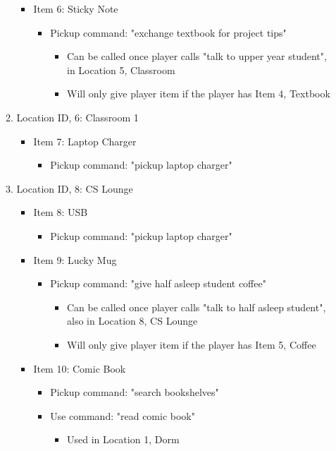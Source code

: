 \documentclass[11pt]{article}
\begin{document}
\begin{enumerate}
\begin{enumerate}
    \begin{itemize}
        \item Item 6: Sticky Note
        \begin{itemize}
            \item Pickup command: "exchange textbook for project tips"
            \begin{itemize}
                \item Can be called once player calls "talk to upper year student", in Location 5, Classroom
                \item Will only give player item if the player has Item 4, Textbook
            \end{itemize}
        \end{itemize}
    \end{itemize}
    \item Location ID, 6: Classroom 1
    \begin{itemize}
        \item Item 7: Laptop Charger
        \begin{itemize}
            \item Pickup command: "pickup laptop charger"
        \end{itemize}
    \end{itemize}
    \item Location ID, 8: CS Lounge
    \begin{itemize}
        \item Item 8: USB
        \begin{itemize}
            \item Pickup command: "pickup laptop charger"
        \end{itemize}
        \item Item 9: Lucky Mug
        \begin{itemize}
            \item Pickup command: "give half asleep student coffee"
            \begin{itemize}
                \item Can be called once player calls "talk to half asleep student", also in Location 8, CS Lounge
                \item Will only give player item if the player has Item 5, Coffee
            \end{itemize}
        \end{itemize}
        \item Item 10: Comic Book
        \begin{itemize}
            \item Pickup command: "search bookshelves"
            \item Use command: "read comic book"
            \begin{itemize}
                \item Used in Location 1, Dorm
            \end{itemize}
        \end{itemize}
    \end{itemize}
\end{enumerate}


\end{enumerate}
\end{document}
